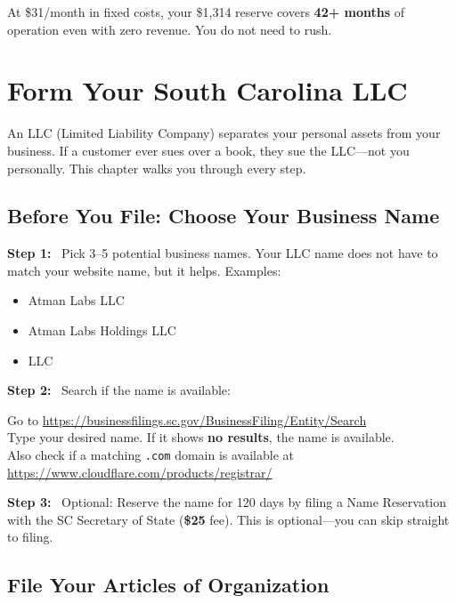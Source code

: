 \documentclass[12pt, letterpaper, oneside]{book}
\newcommand{\cost}[1]{\textcolor{money}{\textbf{#1}}}
\newcommand{\step}[1]{\noindent\textbf{\textcolor{primary}{Step #1:}}~}
\begin{document}
\noindent At \$31/month in fixed costs, your \$1{,}314 reserve covers \textbf{42+ months} of operation even with zero revenue. You do not need to rush.

\chapter{Form Your South Carolina LLC}

An LLC (Limited Liability Company) separates your personal assets from your business. If a customer ever sues over a book, they sue the LLC---not you personally. This chapter walks you through every step.

\section{Before You File: Choose Your Business Name}

\step{1} Pick 3--5 potential business names. Your LLC name does not have to match your website name, but it helps. Examples:
\begin{itemize}[leftmargin=2em]
  \item Atman Labs LLC
  \item Atman Labs Holdings LLC
  \item [YourCreativeName] LLC
\end{itemize}

\step{2} Search if the name is available:
\begin{actionbox}
Go to \url{https://businessfilings.sc.gov/BusinessFiling/Entity/Search}\\[4pt]
Type your desired name. If it shows \textbf{no results}, the name is available.\\[4pt]
Also check if a matching \texttt{.com} domain is available at \url{https://www.cloudflare.com/products/registrar/}
\end{actionbox}

\step{3} Optional: Reserve the name for 120 days by filing a Name Reservation with the SC Secretary of State (\cost{\$25} fee). This is optional---you can skip straight to filing.

\section{File Your Articles of Organization}
\end{document}
